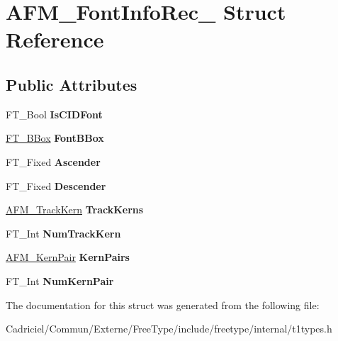 \hypertarget{struct_a_f_m___font_info_rec__}{\section{A\-F\-M\-\_\-\-Font\-Info\-Rec\-\_\- Struct Reference}
\label{struct_a_f_m___font_info_rec__}
}
\subsection*{Public Attributes}
\begin{DoxyCompactItemize}
\item 
\hypertarget{struct_a_f_m___font_info_rec___a6f198e74da5d8a3b7ff7518e255be231}{F\-T\-\_\-\-Bool {\bfseries Is\-C\-I\-D\-Font}}\label{struct_a_f_m___font_info_rec___a6f198e74da5d8a3b7ff7518e255be231}

\item 
\hypertarget{struct_a_f_m___font_info_rec___afa5112d6b0cc51839889206012dc1be6}{\hyperlink{struct_f_t___b_box__}{F\-T\-\_\-\-B\-Box} {\bfseries Font\-B\-Box}}\label{struct_a_f_m___font_info_rec___afa5112d6b0cc51839889206012dc1be6}

\item 
\hypertarget{struct_a_f_m___font_info_rec___a0b80412562435a2198a71aa4188ee85b}{F\-T\-\_\-\-Fixed {\bfseries Ascender}}\label{struct_a_f_m___font_info_rec___a0b80412562435a2198a71aa4188ee85b}

\item 
\hypertarget{struct_a_f_m___font_info_rec___a3561507200f0bc3413988af920924053}{F\-T\-\_\-\-Fixed {\bfseries Descender}}\label{struct_a_f_m___font_info_rec___a3561507200f0bc3413988af920924053}

\item 
\hypertarget{struct_a_f_m___font_info_rec___a8d9305229a1dacc15b8fceb5dbf25b9d}{\hyperlink{struct_a_f_m___track_kern_rec__}{A\-F\-M\-\_\-\-Track\-Kern} {\bfseries Track\-Kerns}}\label{struct_a_f_m___font_info_rec___a8d9305229a1dacc15b8fceb5dbf25b9d}

\item 
\hypertarget{struct_a_f_m___font_info_rec___a08a9207e8d4b0dd9dc0313218462f00e}{F\-T\-\_\-\-Int {\bfseries Num\-Track\-Kern}}\label{struct_a_f_m___font_info_rec___a08a9207e8d4b0dd9dc0313218462f00e}

\item 
\hypertarget{struct_a_f_m___font_info_rec___a16c5da5249d4d4f68cc169469f3ee75a}{\hyperlink{struct_a_f_m___kern_pair_rec__}{A\-F\-M\-\_\-\-Kern\-Pair} {\bfseries Kern\-Pairs}}\label{struct_a_f_m___font_info_rec___a16c5da5249d4d4f68cc169469f3ee75a}

\item 
\hypertarget{struct_a_f_m___font_info_rec___a8ff8af3c83fbf0b060bb711b57f1affd}{F\-T\-\_\-\-Int {\bfseries Num\-Kern\-Pair}}\label{struct_a_f_m___font_info_rec___a8ff8af3c83fbf0b060bb711b57f1affd}

\end{DoxyCompactItemize}


The documentation for this struct was generated from the following file\-:\begin{DoxyCompactItemize}
\item 
Cadriciel/\-Commun/\-Externe/\-Free\-Type/include/freetype/internal/t1types.\-h\end{DoxyCompactItemize}
